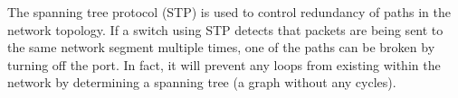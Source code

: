 The spanning tree protocol (STP) is used to control redundancy of paths in the network topology. If a switch using STP detects that packets are being sent to the same network segment multiple times, one of the paths can be broken by turning off the port. In fact, it will prevent any loops from existing within the network by determining a spanning tree (a graph without any cycles).